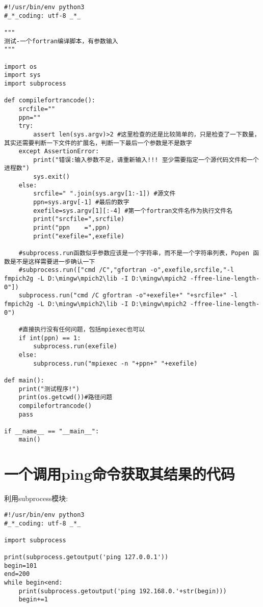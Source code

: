 \documentclass[twoside,11pt]{book}
\begin{document}
\begin{lstlisting}
#!/usr/bin/env python3
#_*_coding: utf-8 _*_

"""
测试-一个fortran编译脚本，有参数输入
"""

import os
import sys
import subprocess

def compilefortrancode():
    srcfile=""
    ppn=""
    try:
        assert len(sys.argv)>2 #这里检查的还是比较简单的，只是检查了一下数量，其实还需要判断一下文件的扩展名，判断一下最后一个参数是不是数字
    except AssertionError:
        print("错误:输入参数不足，请重新输入!!! 至少需要指定一个源代码文件和一个进程数")
        sys.exit()
    else:
        srcfile=" ".join(sys.argv[1:-1]) #源文件
        ppn=sys.argv[-1] #最后的数字
        exefile=sys.argv[1][:-4] #第一个fortran文件名作为执行文件名
        print("srcfile=",srcfile)
        print("ppn    =",ppn)
        print("exefile=",exefile)

    #subprocess.run函数似乎参数应该是一个字符串，而不是一个字符串列表，Popen 函数是不是这样需要进一步确认一下
    #subprocess.run(["cmd /C","gfortran -o",exefile,srcfile,"-l fmpich2g -L D:\mingw\mpich2\lib -I D:\mingw\mpich2 -ffree-line-length-0"])
    subprocess.run("cmd /C gfortran -o"+exefile+" "+srcfile+" -l fmpich2g -L D:\mingw\mpich2\lib -I D:\mingw\mpich2 -ffree-line-length-0")

    #直接执行没有任何问题，包括mpiexec也可以
    if int(ppn) == 1:
        subprocess.run(exefile)
    else:
        subprocess.run("mpiexec -n "+ppn+" "+exefile)

def main():
    print("测试程序!")
    print(os.getcwd())#路径问题
    compilefortrancode()
    pass

if __name__ == "__main__":
    main()
\end{lstlisting}


\section{一个调用ping命令获取其结果的代码}
利用subprocess模块:
\begin{lstlisting}
#!/usr/bin/env python3
#_*_coding: utf-8 _*_

import subprocess

print(subprocess.getoutput('ping 127.0.0.1'))
begin=101
end=200
while begin<end:
    print(subprocess.getoutput('ping 192.168.0.'+str(begin)))
    begin+=1
\end{lstlisting}
\end{document}
